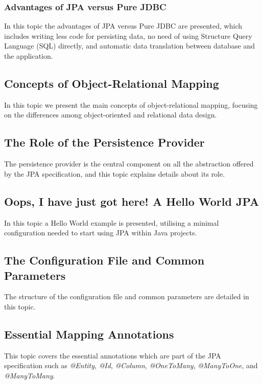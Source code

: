 \documentclass[12pt,a4paper]{article}
\begin{document}
\subsubsection{Advantages of JPA versus Pure JDBC}

In this topic the advantages of JPA versus Pure JDBC are presented, which includes writing less code for persisting data, no need of using Structure Query Language (SQL) directly, and automatic data translation between database and the application.

\subsection{Concepts of Object-Relational Mapping}

In this topic we present the main concepts of object-relational mapping, focusing on the differences among object-oriented and relational data design.

\subsection{The Role of the Persistence Provider}

The persistence provider is the central component on all the abstraction offered by the JPA specification, and this topic explains details about its role. 

\subsection{Oops, I have just got here! A Hello World JPA}

In this topic a Hello World example is presented, utilising a minimal configuration needed to  start using JPA within Java projects.

\subsection{The Configuration File and Common Parameters}

The structure of the configuration file and common parameters are detailed in this topic. 

\subsection{Essential Mapping Annotations}

This topic covers the essential annotations which are part of the JPA specification such as \textit{@Entity}, \textit{@Id}, \textit{@Column}, \textit{@OneToMany}, \textit{@ManyToOne}, and \textit{@ManyToMany}.
\end{document}
